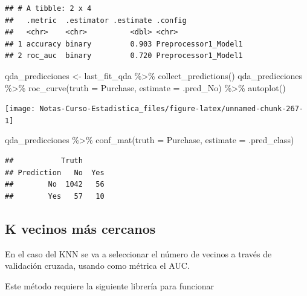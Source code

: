 \documentclass[
  12pt,
]{book}
\newenvironment{Shaded}{\begin{snugshade}}{\end{snugshade}}
\newcommand{\AttributeTok}[1]{\textcolor[rgb]{0.77,0.63,0.00}{#1}}
\newcommand{\FunctionTok}[1]{\textcolor[rgb]{0.00,0.00,0.00}{#1}}
\newcommand{\NormalTok}[1]{#1}
\newcommand{\OtherTok}[1]{\textcolor[rgb]{0.56,0.35,0.01}{#1}}
\newcommand{\SpecialCharTok}[1]{\textcolor[rgb]{0.00,0.00,0.00}{#1}}
\theoremstyle{definition}
\theoremstyle{definition}
\theoremstyle{definition}
\theoremstyle{definition}
\theoremstyle{remark}
\begin{document}
\begin{verbatim}
## # A tibble: 2 x 4
##   .metric  .estimator .estimate .config             
##   <chr>    <chr>          <dbl> <chr>               
## 1 accuracy binary         0.903 Preprocessor1_Model1
## 2 roc_auc  binary         0.720 Preprocessor1_Model1
\end{verbatim}

\begin{Shaded}
\begin{Highlighting}[]
\NormalTok{qda\_predicciones }\OtherTok{\textless{}{-}}\NormalTok{ last\_fit\_qda }\SpecialCharTok{\%\textgreater{}\%}
    \FunctionTok{collect\_predictions}\NormalTok{()}
\NormalTok{qda\_predicciones }\SpecialCharTok{\%\textgreater{}\%}
    \FunctionTok{roc\_curve}\NormalTok{(}\AttributeTok{truth =}\NormalTok{ Purchase, }\AttributeTok{estimate =}\NormalTok{ .pred\_No) }\SpecialCharTok{\%\textgreater{}\%}
    \FunctionTok{autoplot}\NormalTok{()}
\end{Highlighting}
\end{Shaded}

\begin{center}\texttt{[image: Notas-Curso-Estadistica\_files/figure-latex/unnamed-chunk-267-1]} \end{center}

\begin{Shaded}
\begin{Highlighting}[]
\NormalTok{qda\_predicciones }\SpecialCharTok{\%\textgreater{}\%}
    \FunctionTok{conf\_mat}\NormalTok{(}\AttributeTok{truth =}\NormalTok{ Purchase, }\AttributeTok{estimate =}\NormalTok{ .pred\_class)}
\end{Highlighting}
\end{Shaded}

\begin{verbatim}
##           Truth
## Prediction   No  Yes
##        No  1042   56
##        Yes   57   10
\end{verbatim}

\hypertarget{k-vecinos-muxe1s-cercanos}{%
\subsection{K vecinos más cercanos}\label{k-vecinos-muxe1s-cercanos}}

En el caso del KNN se va a seleccionar el número de vecinos a través de validación cruzada, usando como métrica el AUC.

Este método requiere la siguiente librería para funcionar
\end{document}

